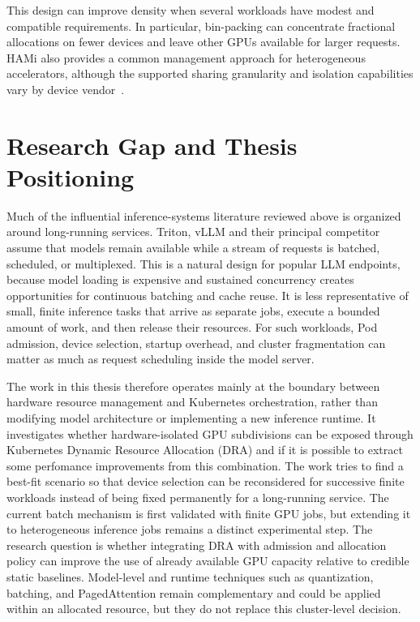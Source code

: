 This design can improve density when several workloads have modest and compatible requirements. In particular, bin-packing can concentrate fractional allocations on fewer devices and leave other GPUs available for larger requests. HAMi also provides a common management approach for heterogeneous accelerators, although the supported sharing granularity and isolation capabilities vary by device vendor~\cite{hami2026faq}.

\section{Research Gap and Thesis Positioning}
\label{sec:sota-positioning}

Much of the influential inference-systems literature reviewed above is organized around long-running services. Triton, vLLM and their principal competitor assume that models remain available while a stream of requests is batched, scheduled, or multiplexed. This is a natural design for popular LLM endpoints, because model loading is expensive and sustained concurrency creates opportunities for continuous batching and cache reuse. It is less representative of small, finite inference tasks that arrive as separate jobs, execute a bounded amount of work, and then release their resources. For such workloads, Pod admission, device selection, startup overhead, and cluster fragmentation can matter as much as request scheduling inside the model server.

The work in this thesis therefore operates mainly at the boundary between hardware resource management and Kubernetes orchestration, rather than modifying model architecture or implementing a new inference runtime. It investigates whether hardware-isolated GPU subdivisions can be exposed through Kubernetes Dynamic Resource Allocation (DRA) and if it is possible to extract some perfomance improvements from this combination. The work tries to find a best-fit scenario so that device selection can be reconsidered for successive finite workloads instead of being fixed permanently for a long-running service. The current batch mechanism is first validated with finite GPU jobs, but extending it to heterogeneous inference jobs remains a distinct experimental step. The research question is whether integrating DRA with admission and allocation policy can improve the use of already available GPU capacity relative to credible static baselines. Model-level and runtime techniques such as quantization, batching, and PagedAttention remain complementary and could be applied within an allocated resource, but they do not replace this cluster-level decision.
